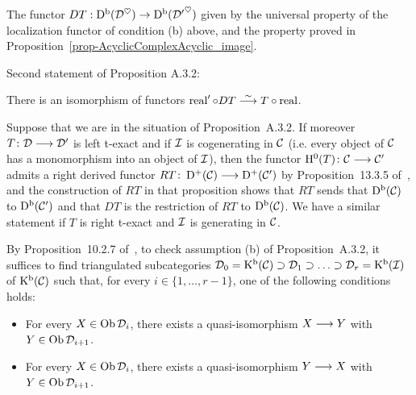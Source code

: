 \begin{definition}
\label{def-derived}
\leanok 
{}

The functor $DT:\operatorname{\mathrm{D}^b}(\mathcal{D}^\heartsuit)\to\operatorname{\mathrm{D}^b}({\mathcal{D}'}^\heartsuit)$ given by the universal property of the 
localization functor of condition (b) above, and the property proved in Proposition~\ref{prop-AcyclicComplexAcyclic_image}.

\end{definition}

Second statement of Proposition A.3.2:

\begin{definition}
\label{def-derived_comp}
\leanok 
{}

There is an isomorphism of functors $\operatorname{real}'\circ DT\stackrel{\sim}{\longrightarrow} T\circ\operatorname{real}$.

\end{definition}



\begin{remark}
Suppose that we are in the situation of Proposition~A.3.2.
If moreover $T\colon \mathcal{D}\longrightarrow\mathcal{D}'$ is left t-exact and if $\mathcal{I}$ is cogenerating in $\mathcal{C}$ (i.e. every object of $\mathcal{C}$ has a monomorphism into an object of $\mathcal{I}$), then the functor
$\mathrm{H}^0(T)\colon \mathcal{C}\longrightarrow\mathcal{C}'$ admits a right derived functor $RT\colon \operatorname{\mathrm{D}^+}(\mathcal{C})\longrightarrow\operatorname{\mathrm{D}^+}(\mathcal{C}')$ by Proposition~13.3.5 of~\cite{KS1}, and the construction of $RT$ in that proposition shows that
$RT$ sends that $\operatorname{\mathrm{D}^b}(\mathcal{C})$ to $\operatorname{\mathrm{D}^b}(\mathcal{C}')$ and that $DT$ is the restriction of $RT$ to $\operatorname{\mathrm{D}^b}(\mathcal{C})$. We have a similar statement if $T$ is right t-exact and $\mathcal{I}$ is generating in $\mathcal{C}$.

\label{rmk_der_fil1}
\end{remark}

\begin{remark}
By Proposition~10.2.7 of~\cite{KS1}, to check assumption (b) of Proposition~A.3.2, it suffices to find triangulated subcategories
$\mathcal{D}_0=\operatorname{\mathrm{K}^b}(\mathcal{C})\supset\mathcal{D}_1\supset\ldots\supset\mathcal{D}_r=\operatorname{\mathrm{K}^b}(\mathcal{I})$ of $\operatorname{\mathrm{K}^b}(\mathcal{C})$ such that, for every $i\in\{1,\ldots,r-1\}$, one of the following conditions holds:
\begin{itemize}
\item For every $X\in\operatorname{\mathrm{Ob}}\mathcal{D}_i$, there exists a quasi-isomorphism $X\longrightarrow Y$ with $Y\in\operatorname{\mathrm{Ob}}\mathcal{D}_{i+1}$.
\item For every $X\in\operatorname{\mathrm{Ob}}\mathcal{D}_i$, there exists a quasi-isomorphism $Y\longrightarrow X$ with $Y\in\operatorname{\mathrm{Ob}}\mathcal{D}_{i+1}$.

\end{itemize}

\label{rmk_der_fil2}
\end{remark}

